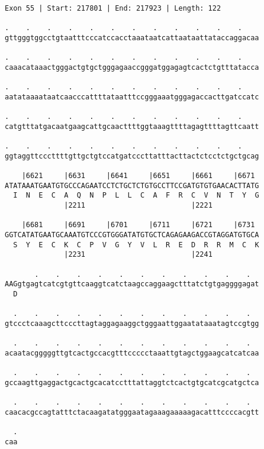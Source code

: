\documentclass{article}
\begin{document}
\begin{Verbatim}
Exon 55 | Start: 217801 | End: 217923 | Length: 122
 
.    .    .    .    .    .    .    .    .    .    .    .    
gttgggtggcctgtaatttcccatccacctaaataatcattaataattataccaggacaa
  
.    .    .    .    .    .    .    .    .    .    .    .    
caaacataaactgggactgtgctgggagaaccgggatggagagtcactctgtttatacca
  
.    .    .    .    .    .    .    .    .    .    .    .    
aatataaaataatcaacccattttataatttccgggaaatgggagaccacttgatccatc
  
.    .    .    .    .    .    .    .    .    .    .    .    
catgtttatgacaatgaagcattgcaacttttggtaaagttttagagttttagttcaatt
  
.    .    .    .    .    .    .    .    .    .    .    .    
ggtaggttcccttttgttgctgtccatgatcccttatttacttactctcctctgctgcag
  
    |6621     |6631     |6641     |6651     |6661     |6671 
ATATAAATGAATGTGCCCAGAATCCTCTGCTCTGTGCCTTCCGATGTGTGAACACTTATG
  I  N  E  C  A  Q  N  P  L  L  C  A  F  R  C  V  N  T  Y  G
              |2211                         |2221           
  
    |6681     |6691     |6701     |6711     |6721     |6731 
GGTCATATGAATGCAAATGTCCCGTGGGATATGTGCTCAGAGAAGACCGTAGGATGTGCA
  S  Y  E  C  K  C  P  V  G  Y  V  L  R  E  D  R  R  M  C  K
              |2231                         |2241           
  
       .    .    .    .    .    .    .    .    .    .    .  
AAGgtgagtcatcgtgttcaaggtcatctaagccaggaagctttatctgtgaggggagat
  D                                                         
  
  .    .    .    .    .    .    .    .    .    .    .    .  
gtccctcaaagcttcccttagtaggagaaggctgggaattggaatataaatagtccgtgg
  
  .    .    .    .    .    .    .    .    .    .    .    .  
acaatacgggggttgtcactgccacgtttccccctaaattgtagctggaagcatcatcaa
  
  .    .    .    .    .    .    .    .    .    .    .    .  
gccaagttgaggactgcactgcacatcctttattaggtctcactgtgcatcgcatgctca
  
  .    .    .    .    .    .    .    .    .    .    .    .  
caacacgccagtatttctacaagatatgggaatagaaagaaaaagacatttccccacgtt
  
  .
caa
\end{Verbatim}
\newpage
\end{document}
